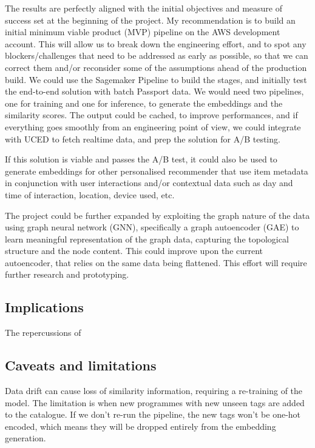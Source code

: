 The results are perfectly aligned with the initial objectives and measure of success set at the beginning of the project.
My recommendation is to build an initial minimum viable product (MVP) pipeline on the AWS development account.
This will allow us to break down the engineering effort, and to spot any blockers/challenges that need to be addressed
as early as possible, so that we can correct them and/or reconsider some of the assumptions ahead of the production build.
We could use the Sagemaker Pipeline to build the stages, and initially test the end-to-end solution with batch Passport data.
We would need two pipelines, one for training and one for inference, to generate the embeddings and the similarity scores.
The output could be cached, to improve performances, and if everything goes smoothly from an engineering point of view,
we could integrate with UCED to fetch realtime data, and prep the solution for A/B testing.

If this solution is viable and passes the A/B test, it could also be used to generate embeddings for
other personalised recommender that use item metadata in conjunction with user interactions and/or contextual data such as
day and time of interaction, location, device used, etc.

The project could be further expanded by exploiting the graph nature of the data using graph neural network (GNN), specifically a
graph autoencoder (GAE) to learn meaningful representation of the graph data, capturing the topological structure and the node content.
This could improve upon the current autoencoder, that relies on the same data being flattened.
This effort will require further research and prototyping.

\subsection{Implications}

The repercussions of

\subsection{Caveats and limitations}

Data drift can cause loss of similarity information, requiring a re-training of the model.
The limitation is when new programmes with new unseen tags are added to the catalogue.
If we don't re-run the pipeline, the new tags won't be one-hot encoded, which means they will be dropped entirely from the embedding generation.

